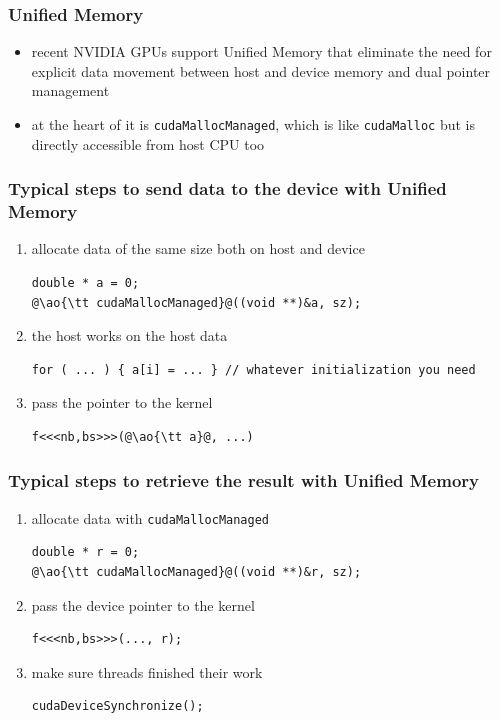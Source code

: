 \documentclass[12pt,dvipdfmx]{beamer}
\newcommand{\ao}[1]{{\color{blue}#1}}
\begin{document}
\begin{frame}
  \frametitle{Unified Memory}
  \begin{itemize}
  \item recent NVIDIA GPUs support \ao{Unified Memory} that eliminate the need for
    explicit data movement between host and device memory
    and dual pointer management
  \item at the heart of it is \ao{\tt cudaMallocManaged}, which is like
    {\tt cudaMalloc} but is directly accessible from host CPU too
  \end{itemize}
\end{frame}


\begin{frame}[fragile]
\frametitle{Typical steps to send data to the device with Unified Memory}
\begin{enumerate}
\item allocate data of the same size both on host and device
\begin{lstlisting}
double * a = 0;
@\ao{\tt cudaMallocManaged}@((void **)&a, sz);
\end{lstlisting}

\item the host works on the host data
\begin{lstlisting}
for ( ... ) { a[i] = ... } // whatever initialization you need
\end{lstlisting}

\item pass the pointer to the kernel 
\begin{lstlisting}
f<<<nb,bs>>>(@\ao{\tt a}@, ...)
\end{lstlisting}

\end{enumerate}
\end{frame}


\begin{frame}[fragile]
\frametitle{Typical steps to retrieve the result with Unified Memory}
\begin{enumerate}
\item allocate data with {\tt cudaMallocManaged}
\begin{lstlisting}
double * r = 0;
@\ao{\tt cudaMallocManaged}@((void **)&r, sz);
\end{lstlisting}

\item pass the device pointer to the kernel 
\begin{lstlisting}
f<<<nb,bs>>>(..., r);
\end{lstlisting}

\item make sure threads finished their work
\begin{lstlisting}
cudaDeviceSynchronize();
\end{lstlisting}
\end{enumerate}
\end{frame}
\end{document}
